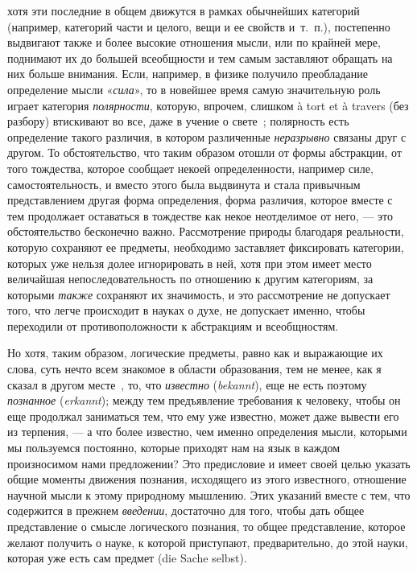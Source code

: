 хотя эти последние в общем движутся в рамках обычнейших категорий
(например, категорий части и целого, вещи и ее свойств и~т.~п.), постепенно
выдвигают также и более высокие отношения мысли, или по крайней мере,
поднимают их до большей всеобщности и тем самым заставляют обращать на них
больше внимания. Если, например, в физике получило преобладание определение
мысли «{\em сила}», то в новейшее время самую
значительную роль играет категория {\em полярности},
которую, впрочем, слишком à tort et à travers (без разбору) втискивают во
все, даже в учение о
свете~;
полярность есть определение такого различия, в котором различенные
{\em неразрывно} связаны друг с другом. То
обстоятельство, что таким образом отошли от формы абстракции, от того
тождества, которое сообщает некоей определенности, например силе,
самостоятельность, и вместо этого была выдвинута и стала привычным
представлением другая форма определения, форма различия, которое вместе с
тем продолжает оставаться в тождестве как некое неотделимое от него, — это
обстоятельство бесконечно важно. Рассмотрение природы благодаря реальности,
которую сохраняют ее предметы, необходимо заставляет фиксировать категории,
которых уже нельзя долее игнорировать в ней, хотя при этом имеет место
величайшая непоследовательность по отношению к другим категориям, за
которыми {\em также} сохраняют их значимость, и это
рассмотрение не допускает того, что легче происходит в науках о духе, не
допускает именно, чтобы переходили от противоположности к абстракциям и
всеобщностям.

Но хотя, таким образом, логические предметы, равно как и выражающие их
слова, суть нечто всем знакомое в области образования, тем не менее, как я
сказал в другом
месте~,
то, что {\em известно}
({\em bekannt}), еще не есть поэтому
{\em познанное} ({\em erkannt});
между тем предъявление требования к человеку, чтобы он еще продолжал
заниматься тем, что ему уже известно, может даже вывести его из терпения, —
а что более известно, чем именно определения мысли, которыми мы пользуемся
постоянно, которые приходят нам на язык в каждом произносимом нами
предложении? Это предисловие и имеет своей целью указать общие моменты
движения познания, исходящего из этого известного, отношение научной мысли
к этому природному мышлению. Этих указаний вместе с тем, что содержится в
прежнем {\em введении}, достаточно для того, чтобы дать
общее представление о смысле логического познания, то общее представление,
которое желают получить о науке, к которой приступают, предварительно, до
этой науки, которая уже есть сам предмет (die Sache selbst).

